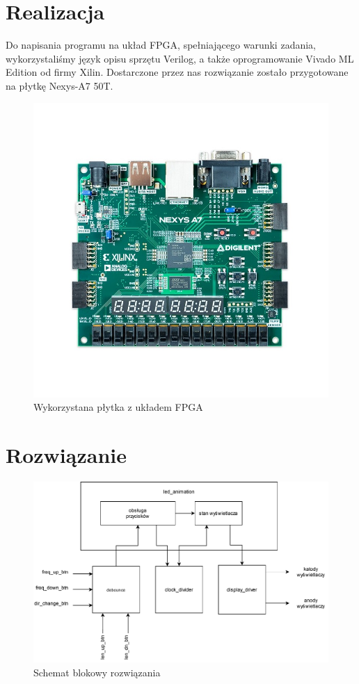 \documentclass[a4paper]{article}
\begin{document}
\pagebreak
\section{Realizacja}
Do napisania programu na układ FPGA, spełniającego warunki zadania, wykorzystaliśmy język opisu sprzętu Verilog, a także
oprogramowanie Vivado ML Edition od firmy Xilin.
Dostarczone przez nas rozwiązanie zostało przygotowane na płytkę Nexys-A7 50T.

\begin{figure}[H]
    \centering
    \includegraphics[width=\textwidth]{nexys-a7-artix-50t-fpga-xilinx-edu.jpg}
    \caption{Wykorzystana płytka z układem FPGA}
\end{figure}

\section{Rozwiązanie}
\begin{figure}[H]
    \centering
    \includegraphics[width=\textwidth]{led_animation.drawio.pdf}
    \caption{Schemat blokowy rozwiązania}
\end{figure}
\end{document}
